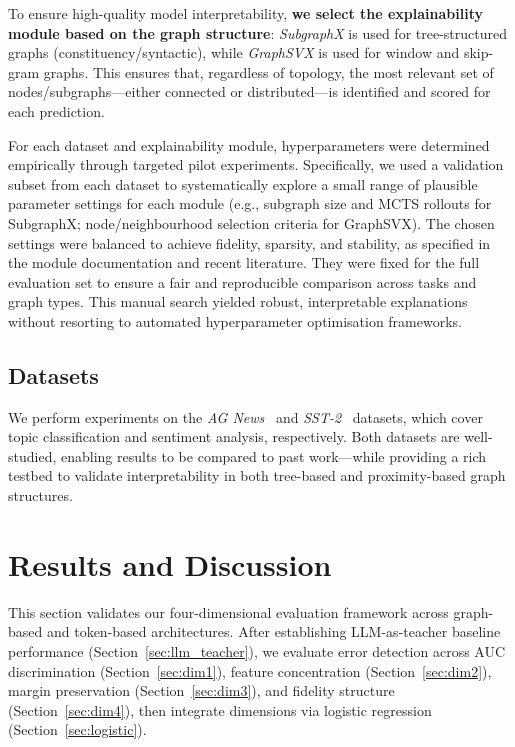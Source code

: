 \documentclass[preprint, times, review, 10pt]{elsarticle}
\begin{document}
To ensure high-quality model interpretability, \textbf{we select the explainability module based on the graph structure}: \textit{SubgraphX} is used for tree-structured graphs (constituency/syntactic), while \textit{GraphSVX} is used for window and skip-gram graphs. This ensures that, regardless of topology, the most relevant set of nodes/subgraphs—either connected or distributed—is identified and scored for each prediction.

For each dataset and explainability module, hyperparameters were determined empirically through targeted pilot experiments. Specifically, we used a validation subset from each dataset to systematically explore a small range of plausible parameter settings for each module (e.g., subgraph size and MCTS rollouts for SubgraphX; node/neighbourhood selection criteria for GraphSVX). The chosen settings were balanced to achieve fidelity, sparsity, and stability, as specified in the module documentation and recent literature. They were fixed for the full evaluation set to ensure a fair and reproducible comparison across tasks and graph types. This manual search yielded robust, interpretable explanations without resorting to automated hyperparameter optimisation frameworks.


\subsection{Datasets}

We perform experiments on the \textit{AG News}~\cite{10.5555/2969239.2969312} and \textit{SST-2}~\cite{socher-etal-2013-recursive} datasets, which cover topic classification and sentiment analysis, respectively. Both datasets are well-studied, enabling results to be compared to past work—while providing a rich testbed to validate interpretability in both tree-based and proximity-based graph structures.



\section{Results and Discussion} \label{discussion}

This section validates our four-dimensional evaluation framework across graph-based and token-based architectures. After establishing LLM-as-teacher baseline performance (Section~\ref{sec:llm_teacher}), we evaluate error detection across AUC discrimination (Section~\ref{sec:dim1}), feature concentration (Section~\ref{sec:dim2}), margin preservation (Section~\ref{sec:dim3}), and fidelity structure (Section~\ref{sec:dim4}), then integrate dimensions via logistic regression (Section~\ref{sec:logistic}).
\end{document}
